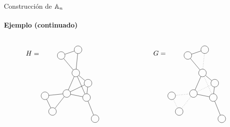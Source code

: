 \documentclass[spanish]{beamer}
\begin{document}
\begin{frame}{Construcción de $\mathbb{A}_n$}
  \framesubtitle{Ejemplo (continuado)}
  \begin{columns}
    \begin{column}{0.5\textwidth}
      \begin{equation*}
      H = 
      \begin{tikzpicture}[baseline = (v1.base), every node/.style={inner 
        sep=4pt, circle, draw}]
      \node (v1) at (0.045723322887135334, 1.6531597581429232) {};
      \node (v2) at (0.924316069611771, 1.9552990371412833) {};
      \node (v3) at (0.807141212124488, 0.7440631434777515) {};
      \node (v4) at (1.366122335327793, -0.5380224344255913) {};
      \node (v5) at (0.335701115736255, -0.32692551580387064) {};
      \node (v6) at (-0.7967889893835305, -0.4447190885953058) {};
      \node (v7) at (1.809072637133212, -1.6407619146874255) {};
      \node (v8) at (-0.4041868846702505, -1.263837477786485) {};
      \node (v9) at (1.4439611250960338, 0.21170887735943703) {};
      \draw (v1) -- (v2);
      \draw (v1) -- (v3);
      \draw (v2) -- (v3);
      \draw (v3) -- (v4);
      \draw (v3) -- (v5);
      \draw (v3) -- (v9);
      \draw (v4) -- (v5);
      \draw (v4) -- (v7);
      \draw (v4) -- (v9);
      \draw (v5) -- (v6);
      \draw (v5) -- (v8);
      \draw (v5) -- (v9);
      \draw (v6) -- (v8);
      \end{tikzpicture}
      \end{equation*}
    \end{column}
    \begin{column}{0.5\textwidth}
      \begin{equation*}
      G = 
      \begin{tikzpicture}[baseline = (v1.base), every node/.style={inner 
        sep=4pt, circle, draw}]
      \node (v1) at (0.045723322887135334, 1.6531597581429232) {};
      \node (v2) at (0.924316069611771, 1.9552990371412833) {};
      \node (v3) at (0.807141212124488, 0.7440631434777515) {};
      \node (v4) at (1.366122335327793, -0.5380224344255913) {};
      \node (v5) at (0.335701115736255, -0.32692551580387064) {};
      \node (v6) at (-0.7967889893835305, -0.4447190885953058) {};
      \node (v7) at (1.809072637133212, -1.6407619146874255) {};
      \node (v8) at (-0.4041868846702505, -1.263837477786485) {};
      \node (v9) at (1.4439611250960338, 0.21170887735943703) {};
      \draw (v1) -- (v2);
      \draw (v1) -- (v3);
      \draw[dotted] (v2) -- (v3);
      \draw[dotted] (v3) -- (v4);
      \draw (v3) -- (v5);
      \draw (v3) -- (v9);
      \draw (v4) -- (v5);
      \draw (v4) -- (v7);
      \draw (v4) -- (v9);
      \draw[dotted] (v5) -- (v6);
      \draw[dotted] (v5) -- (v8);
      \draw[dotted] (v5) -- (v9);
      \draw[dotted] (v6) -- (v8);
      \end{tikzpicture}
      \end{equation*}
    \end{column}
  \end{columns}
\end{frame}
\end{document}
